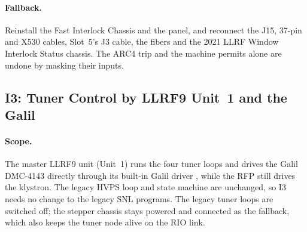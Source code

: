 \paragraph{Fallback.} Reinstall the Fast Interlock Chassis and the panel, and
reconnect the J15, 37-pin and X530 cables, Slot~5's J3 cable, the fibers and the 2021
LLRF Window Interlock Status chassis. The ARC4
trip and the machine permits alone are undone by masking their inputs.

\subsection{I3: Tuner Control by LLRF9 Unit~1 and the Galil}\label{sec:i-tuner}

\paragraph{Scope.} The master LLRF9 unit (Unit~1) runs the four tuner loops and drives
the Galil DMC-4143 directly through its built-in Galil driver , while the RFP still
drives the klystron. The legacy HVPS loop and state machine are unchanged, so I3 needs
no change to the legacy SNL programs. The legacy tuner loops are switched off; the
stepper chassis stays powered and connected as the fallback, which also keeps the
tuner node alive on the RIO link.


